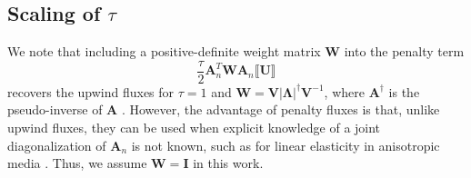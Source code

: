 \documentclass[preprint,10pt]{elsarticle}
\newcommand{\LRp}[1]{\left( #1 \right)}
\newcommand{\LRb}[1]{\left| #1 \right|}
\newcommand{\jump}[1] {\ensuremath{\llbracket#1\rrbracket}}
\newcommand{\note}[1]{{\color{blue}#1}}
\begin{document}
\subsection{Scaling of $\tau$}

We note that including a positive-definite weight matrix $\bm{W}$ into the penalty term
\[
\frac{\tau}{2} \bm{A}_n^T \bm{W}\bm{A}_n\jump{\bm{U}}
\]
recovers the upwind fluxes for $\tau = 1$ and $\bm{W} = \bm{V}\LRb{\bm{\Lambda}}^{\dagger}\bm{V}^{-1}$, where $\bm{A}^{\dagger}$ is the pseudo-inverse of $\bm{A}$ \cite{horn2012matrix}.  However, the advantage of penalty fluxes is that, unlike upwind fluxes, they can be used when explicit knowledge of a \note{joint} diagonalization of $\bm{A}_n$ is not known, such as for linear elasticity in anisotropic media \cite{ye2016discontinuous}.  Thus, we assume $\bm{W} = \bm{I}$ in this work.  
\end{document}
